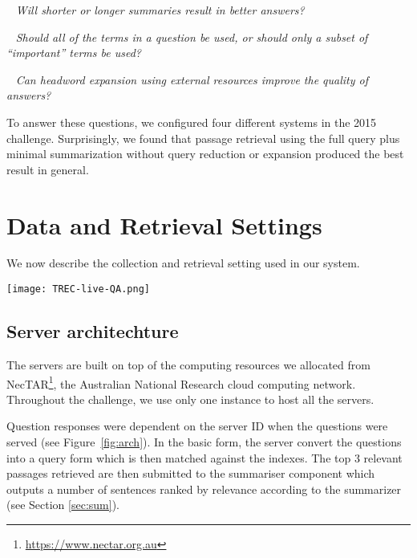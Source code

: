 \documentclass[a4paper,10pt,conference,compsocconf,final]{IEEEtran}
\newcommand{\myparagraph}[1]{\vspace*{1ex}\noindent{\textbf{#1.}}~}
\newcommand{\ko}[1]{\textrm{\textcolor{red}{Kevin says: #1\\}}}
\begin{document}
\myparagraph{RQ 1:}
{\emph{
Will shorter or longer summaries result in better answers?
}}

\myparagraph{RQ 2:}
{\emph{
Should all of the terms in a question be used, or should only a 
subset of ``important'' terms be used?
}}

\myparagraph{RQ 3:}
{\emph{
Can headword expansion using external resources improve the
quality of answers?
}}

\bigskip

To answer these questions, we configured four different systems 
in the 2015 challenge.
Surprisingly, we found that passage retrieval using the full query
plus minimal summarization without query reduction or expansion
produced the best result in general.

\section{Data and Retrieval Settings}
We now describe the collection and retrieval setting used in our
system. 

\begin{figure*}
  \centering
  \texttt{[image: TREC-live-QA.png]}
  \label{fig:arch}
  \caption{System architechture for each RMIT system. Green shading indicates components that are different when compared to RMIT-0.}
\end{figure*}

\subsection{Server architechture}

The servers are built on top of the computing resources we allocated from
NecTAR\footnote{\url{https://www.nectar.org.au}}, the Australian National
Research cloud computing network.  Throughout the challenge, we use only one
instance to host all the servers.

Question responses were dependent on the server ID when the questions were served (see Figure~\ref{fig:arch}). In the basic form, the server convert the questions into a query form which is then matched against the indexes.
The top 3 relevant passages retrieved are then submitted to the summariser component which outputs a number of sentences ranked by relevance according to the summarizer (see Section \ref{sec:sum}). 
\end{document}
